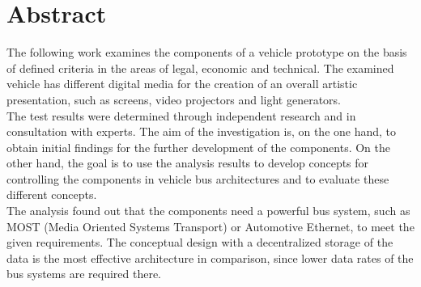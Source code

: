 \chapter*{Abstract} %
The following work examines the components of a vehicle prototype on the basis of defined criteria in the areas of legal, economic and technical. The examined vehicle has different digital media for the creation of an overall artistic presentation, such as screens, video projectors and light generators. \\
The test results were determined through independent research and in consultation with experts. The aim of the investigation is, on the one hand, to obtain initial findings for the further development of the components. On the other hand, the goal is to use the analysis results to develop concepts for controlling the components in vehicle bus architectures and to evaluate these different concepts. \\
The analysis found out that the components need a powerful bus system, such as MOST (Media Oriented Systems Transport) or Automotive Ethernet, to meet the given requirements. The conceptual design with a decentralized storage of the data is the most effective architecture in comparison, since lower data rates of the bus systems are required there.


\cleardoublepage